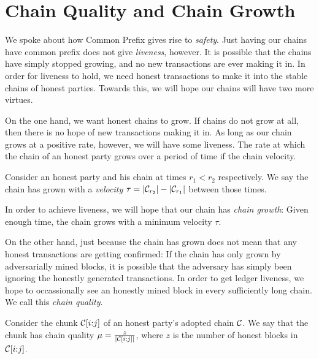 \section{Chain Quality and Chain Growth}

We spoke about how Common Prefix gives rise to \emph{safety}. Just having our chains
have common prefix does not give \emph{liveness}, however. It is possible that the chains
have simply stopped growing, and no new transactions are ever making it in. In order
for liveness to hold, we need honest transactions to make it into the stable chains
of honest parties. Towards this, we will hope our chains will have two more virtues.

On the one hand, we want honest chains to grow. If chains do not grow at all, then
there is no hope of new transactions making it in. As long as our chain grows
at a positive rate, however, we will have some liveness. The rate at which the
chain of an honest party grows over a period of time if the chain velocity.

\begin{definition}
  Consider an honest party and his chain at times $r_1 < r_2$ respectively.
  We say the chain has grown with a \emph{velocity} $\tau = |\mathcal{C}_{r_2}| - |\mathcal{C}_{r_1}|$
  between those times.
\end{definition}

In order to achieve liveness, we will hope that our chain has \emph{chain growth}:
Given enough time, the chain grows with a minimum velocity $\tau$.

On the other hand, just because the chain has grown does not mean that any honest
transactions are getting confirmed: If the chain has only grown by adversarially mined
blocks, it is possible that the adversary has simply been ignoring the honestly generated
transactions. In order to get ledger liveness, we hope to occassionally see an honestly
mined block in every sufficiently long chain. We call this \emph{chain quality}.

\begin{definition}
  Consider the chunk $\mathcal{C}[i{:}j]$ of an honest party's adopted chain $\mathcal{C}$.
  We say that the chunk has chain quality $\mu = \frac{z}{|\mathcal{C}[i{:}j]|}$, where
  $z$ is the number of honest blocks in $\mathcal{C}[i{:}j]$.
\end{definition}

